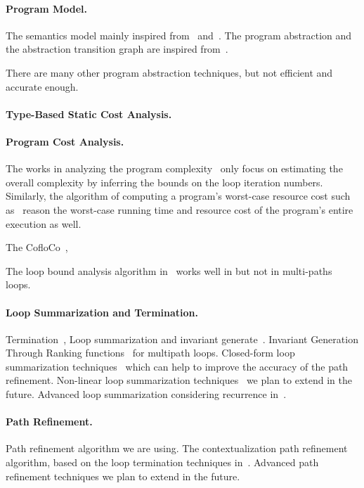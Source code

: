 
\paragraph*{Program Model.}
The semantics model mainly inspired from~\cite{Cousot19a} and~\cite{Cousot19}.
The program abstraction and the abstraction transition graph are inspired from~\cite{SinnZV17}.

There are many other program abstraction techniques, but not efficient and accurate enough.

\paragraph{Type-Based Static Cost Analysis.}
\paragraph{Program Cost Analysis.}
The works in analyzing the program complexity~\cite{GustafssonEL05, HumenbergerJK18} only focus on estimating 
the overall complexity 
by inferring the bounds on the loop iteration numbers.
Similarly, the algorithm of computing a program's worst-case resource cost
such as~\cite{BrockschmidtEFFG16, AlbertAGP08, AliasDFG10, Flores-MontoyaH14} reason the worst-case running time and resource cost of the program's entire execution as well.

The CofloCo~\cite{Montoya17, Flores-MontoyaH14, Flores-Montoya16},

The loop bound analysis algorithm in~\cite{LuCT21} works well in but not in multi-paths loops.
\paragraph{Loop Summarization and Termination.}
Termination~\cite{FalkeKS12, FalkeKS11},
Loop summarization and invariant generate~\cite{HumenbergerJK18}.
Invariant Generation Through Ranking functions~\cite{AliasDFG10} for multipath loops.
Closed-form loop summarization techniques~\cite{KincaidBCR19} which can help to improve the accuracy of the path refinement.
Non-linear loop summarization techniques~\cite{KincaidCBR18} we plan to extend in the future.
Advanced loop summarization considering recurrence in~\cite{BreckCKR20}.
\paragraph{Path Refinement.}
\cite{GulwaniJK09}
Path refinement algorithm we are using.
\cite{SinnZV14}
The contextualization path refinement algorithm, based on the loop termination techniques in~\todo{}.
\cite{CyphertBKR19}
Advanced path refinement techniques we plan to extend in the future.
